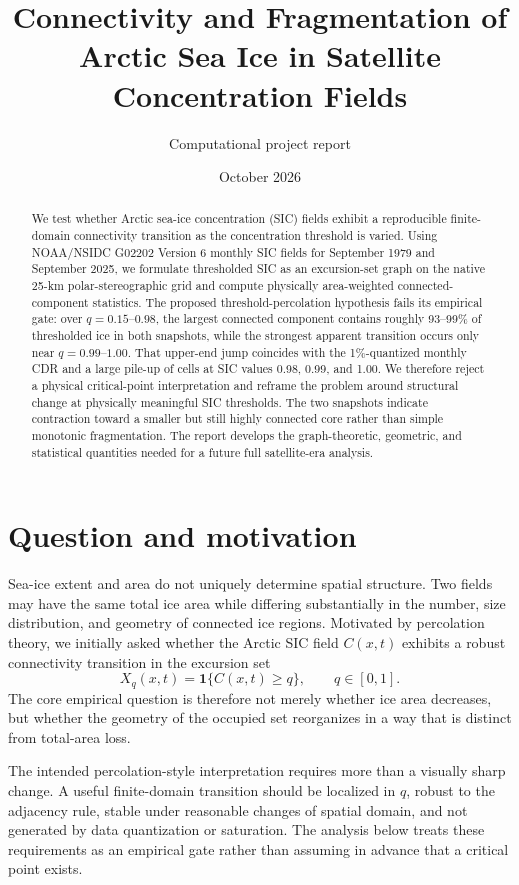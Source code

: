 \documentclass[11pt]{article}
\title{Connectivity and Fragmentation of Arctic Sea Ice in Satellite Concentration Fields}
\author{Computational project report}
\date{October 2026}
\begin{document}
\maketitle

\begin{abstract}
We test whether Arctic sea-ice concentration (SIC) fields exhibit a reproducible finite-domain connectivity transition as the concentration threshold is varied. Using NOAA/NSIDC G02202 Version 6 monthly SIC fields for September 1979 and September 2025, we formulate thresholded SIC as an excursion-set graph on the native 25-km polar-stereographic grid and compute physically area-weighted connected-component statistics. The proposed threshold-percolation hypothesis fails its empirical gate: over $q=0.15$--$0.98$, the largest connected component contains roughly 93--99\% of thresholded ice in both snapshots, while the strongest apparent transition occurs only near $q=0.99$--$1.00$. That upper-end jump coincides with the 1\%-quantized monthly CDR and a large pile-up of cells at SIC values 0.98, 0.99, and 1.00. We therefore reject a physical critical-point interpretation and reframe the problem around structural change at physically meaningful SIC thresholds. The two snapshots indicate contraction toward a smaller but still highly connected core rather than simple monotonic fragmentation. The report develops the graph-theoretic, geometric, and statistical quantities needed for a future full satellite-era analysis.
\end{abstract}

\section{Question and motivation}
Sea-ice extent and area do not uniquely determine spatial structure. Two fields may have the same total ice area while differing substantially in the number, size distribution, and geometry of connected ice regions. Motivated by percolation theory, we initially asked whether the Arctic SIC field $C(x,t)$ exhibits a robust connectivity transition in the excursion set
\[
X_q(x,t)=\mathbf{1}\{C(x,t)\ge q\}, \qquad q\in[0,1].
\]
The core empirical question is therefore not merely whether ice area decreases, but whether the geometry of the occupied set reorganizes in a way that is distinct from total-area loss.

The intended percolation-style interpretation requires more than a visually sharp change. A useful finite-domain transition should be localized in $q$, robust to the adjacency rule, stable under reasonable changes of spatial domain, and not generated by data quantization or saturation. The analysis below treats these requirements as an empirical gate rather than assuming in advance that a critical point exists.
\end{document}
